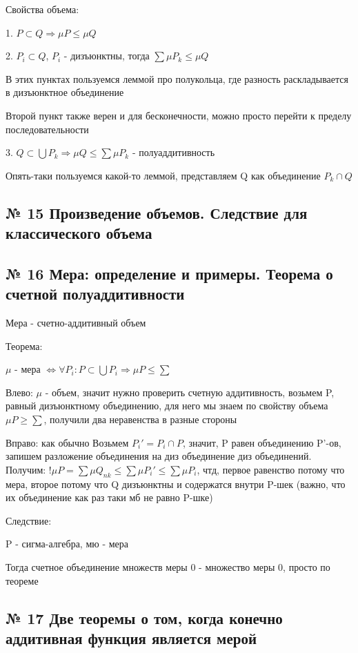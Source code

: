 \documentclass{article}
\begin{document}
Свойства объема:

1. $P \subset Q \Rightarrow \mu P \leq \mu Q$

2. $P_i \subset Q$, $P_i$ - дизъюнктны, тогда $\sum{\mu P_k} \leq \mu Q$

В этих пунктах пользуемся леммой про полукольца, где разность раскладывается в дизъюнктное объединение

Второй пункт также верен и для бесконечности, можно просто перейти к пределу последовательности

3. $Q \subset \bigcup{P_k} \Rightarrow \mu Q \leq \sum{\mu P_k}$ - полуаддитивность

Опять-таки пользуемся какой-то леммой, представляем Q как объединение $P_k \cap Q$

\subsection{ \footnotesize № 15 Произведение объемов. Следствие для классического объема}

\subsection{ \footnotesize № 16 Мера: определение и примеры. Теорема о счетной полуаддитивности}

Мера - счетно-аддитивный объем

Теорема:

$\mu$ - мера $\Leftrightarrow \forall P_i : P \subset \bigcup P_i \Rightarrow \mu P \leq \sum$

Влево: $\mu$ - объем, значит нужно проверить счетную аддитивность, возьмем P, равный дизъюнктному объединению, для него мы знаем по свойству объема $\mu P \geq \sum$, получили два неравенства в разные стороны

Вправо: как обычно Возьмем $P_i' = P_i \cap P$, значит, P равен объединению P'-ов, запишем разложение объединения на диз объединение диз объединений. Получим: !$\mu P = \sum{\mu Q_{nk}} \leq \sum{\mu P_i'} \leq \sum{\mu P_i}$, чтд, первое равенство потому что мера, второе потому что Q дизъюнктны и содержатся внутри P-шек (важно, что их объединение как раз таки мб не равно P-шке)

Следствие:

P - сигма-алгебра, мю - мера

Тогда счетное объединение множеств меры 0 - множество меры 0, просто по теореме

\subsection{ \footnotesize № 17 Две теоремы о том, когда конечно аддитивная функция является мерой}
\end{document}
